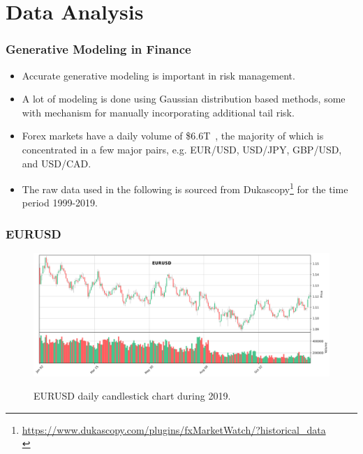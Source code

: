 \documentclass{beamer}
\begin{document}

\section{Data Analysis}

\begin{frame}
    \frametitle{Generative Modeling in Finance}
    \begin{itemize}
        \item Accurate generative modeling is important in risk management.
        \item A lot of modeling is done using Gaussian distribution based methods, some with mechanism for manually incorporating additional tail risk.
        \item Forex markets have a daily volume of \$6.6T~\cite{bis_2019}, the majority of which is concentrated in a few major pairs, e.g. EUR/USD, USD/JPY, GBP/USD, and USD/CAD.
        \item The raw data used in the following is sourced from Dukascopy\footnote{\href{https://www.dukascopy.com/plugins/fxMarketWatch/?historical_data}{https://www.dukascopy.com/plugins/fxMarketWatch/?historical\_data} \\} for the time period 1999-2019.
    \end{itemize}
\end{frame}

\begin{frame}
    \frametitle{EURUSD}
    \begin{figure}
        \includegraphics[width=1\linewidth]{candlestick_EURUSD.png}
        \label{EURUSD}
        \caption{EURUSD daily candlestick chart during 2019.}
    \end{figure}
\end{frame}
\end{document}
